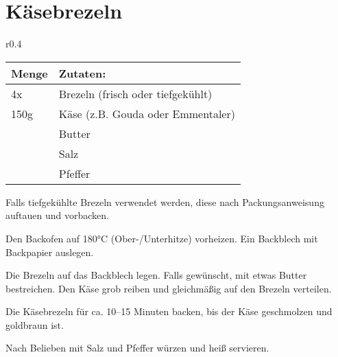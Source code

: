 \documentclass[../../book.tex]{subfiles}
\begin{document}
\section{Käsebrezeln}
\begin{wraptable}{r}{0.4\textwidth}
  \centering
  \begin{tabularx}{0.39\textwidth}{|l|X|}
    \toprule
    Menge & Zutaten: \\
    \midrule
    4x & Brezeln (frisch oder tiefgekühlt) \\
    \midrule
    150g & Käse (z.B. Gouda oder Emmentaler) \\
    \midrule
    & Butter \\
    \midrule
    & Salz \\
    \midrule
    & Pfeffer \\
    \bottomrule
  \end{tabularx}
\end{wraptable}

Falls tiefgekühlte Brezeln verwendet werden, diese nach Packungsanweisung auftauen und vorbacken.

Den Backofen auf 180°C (Ober-/Unterhitze) vorheizen. Ein Backblech mit Backpapier auslegen.

Die Brezeln auf das Backblech legen. Falls gewünscht, mit etwas Butter bestreichen. Den Käse grob reiben und gleichmäßig auf den Brezeln verteilen.

Die Käsebrezeln für ca. 10–15 Minuten backen, bis der Käse geschmolzen und goldbraun ist.

Nach Belieben mit Salz und Pfeffer würzen und heiß servieren.

\newpage
\end{document}
